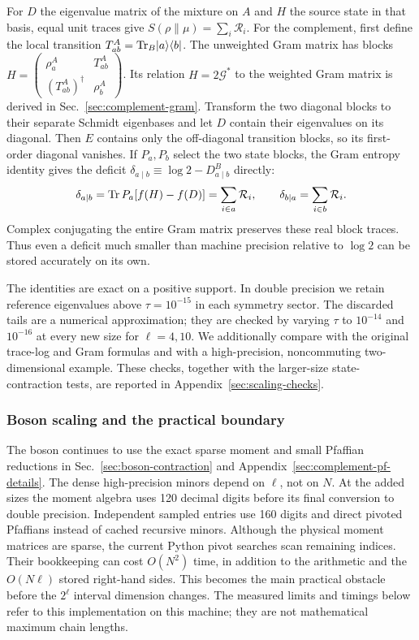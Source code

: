 For $D$ the eigenvalue matrix of the mixture on $A$ and $H$ the source
state in that basis, equal unit traces give
$S(\rho\|\mu)=\sum_i\mathcal R_i$. For the complement, first define
the local transition $T_{ab}^A=\operatorname{Tr}_B\lvert a\rangle\langle b\rvert$.
The unweighted Gram matrix has blocks
$H=\left(\begin{smallmatrix}\rho_a^A&T_{ab}^A\\
(T_{ab}^A)^\dagger&\rho_b^A\end{smallmatrix}\right)$.
Its relation $H=2\mathcal G^*$ to the weighted Gram matrix is derived
in Sec.~\ref{sec:complement-gram}. Transform the two diagonal blocks
to their separate Schmidt eigenbases and let $D$ contain their
eigenvalues on its diagonal.
Then $E$ contains only the off-diagonal transition blocks, so its
first-order diagonal vanishes. If $P_a,P_b$ select the two state blocks,
the Gram entropy identity gives the deficit
$\delta_{a\mid b}\equiv\log2-D^B_{a\mid b}$ directly:
\begin{equation}
 \delta_{a\mid b}=\operatorname{Tr} P_a[f(H)-f(D)]
       =\sum_{i\in a}\mathcal R_i,\qquad
 \delta_{b\mid a}=\sum_{i\in b}\mathcal R_i.
 \label{eq:stable-deficit}
\end{equation}
Complex conjugating the entire Gram matrix preserves these real block
traces. Thus even a deficit much smaller than machine precision
relative to $\log2$ can be stored accurately on its own.

The identities are exact on a positive support. In double precision
we retain reference eigenvalues above $\tau=10^{-15}$ in each
symmetry sector. The discarded tails are a numerical approximation;
they are checked by varying $\tau$ to $10^{-14}$ and $10^{-16}$ at
every new size for $\ell=4,10$. We additionally compare with the original
trace-log and Gram formulas and with a high-precision, noncommuting
two-dimensional example. These checks, together with the larger-size
state-contraction tests, are reported in Appendix~\ref{sec:scaling-checks}.

\subsubsection{Boson scaling and the practical boundary}
The boson continues to use the exact sparse moment and small Pfaffian
reductions in Sec.~\ref{sec:boson-contraction} and
Appendix~\ref{sec:complement-pf-details}. The dense high-precision
minors depend on $\ell$, not on $N$. At the added sizes the moment
algebra uses 120 decimal digits before its final conversion to double
precision. Independent sampled entries use 160 digits and direct
pivoted Pfaffians instead of cached recursive minors.
Although the physical moment matrices are sparse, the current Python
pivot searches scan remaining indices. Their bookkeeping can cost
$O(N^2)$ time, in addition to the arithmetic and the $O(N\ell)$ stored
right-hand sides. This becomes the main practical obstacle before the
$2^\ell$ interval dimension changes. The measured limits and timings
below refer to this implementation on this machine; they are not
mathematical maximum chain lengths.

